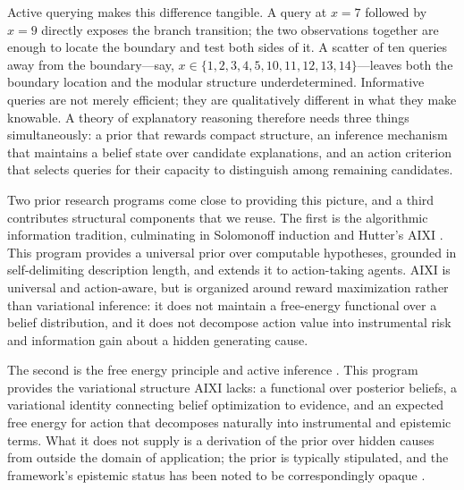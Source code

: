 \documentclass[11pt]{article}
\theoremstyle{remark}
\begin{document}
Active querying makes this difference tangible. A query at \(x = 7\) followed by \(x = 9\) directly exposes the branch transition; the two observations together are enough to locate the boundary and test both sides of it. A scatter of ten queries away from the boundary---say, \(x \in \{1, 2, 3, 4, 5, 10, 11, 12, 13, 14\}\)---leaves both the boundary location and the modular structure underdetermined. Informative queries are not merely efficient; they are qualitatively different in what they make knowable. A theory of explanatory reasoning therefore needs three things simultaneously: a prior that rewards compact structure, an inference mechanism that maintains a belief state over candidate explanations, and an action criterion that selects queries for their capacity to distinguish among remaining candidates.

Two prior research programs come close to providing this picture, and a third contributes structural components that we reuse. The first is the algorithmic information tradition, culminating in Solomonoff induction and Hutter's AIXI \citep{Solomonoff1964a,Solomonoff1964b,Kolmogorov1965,Chaitin1975,Solomonoff1978,Hutter2005}. This program provides a universal prior over computable hypotheses, grounded in self-delimiting description length, and extends it to action-taking agents. AIXI is universal and action-aware, but is organized around reward maximization rather than variational inference: it does not maintain a free-energy functional over a belief distribution, and it does not decompose action value into instrumental risk and information gain about a hidden generating cause.

The second is the free energy principle and active inference \citep{Friston2010,FristonEtAl2017Process,FristonEtAl2017Curiosity,ParrFriston2019}. This program provides the variational structure AIXI lacks: a functional over posterior beliefs, a variational identity connecting belief optimization to evidence, and an expected free energy for action that decomposes naturally into instrumental and epistemic terms. What it does not supply is a derivation of the prior over hidden causes from outside the domain of application; the prior is typically stipulated, and the framework's epistemic status has been noted to be correspondingly opaque \citep{ColombWright2021}.
\end{document}
